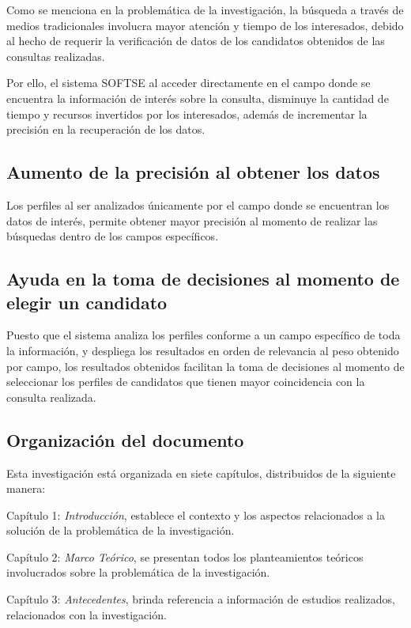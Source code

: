 Como se menciona en la problemática de la investigación, la búsqueda a través de medios tradicionales involucra mayor atención y tiempo de los interesados, debido al hecho de requerir la verificación de datos de los candidatos obtenidos de las consultas realizadas.

Por ello, el sistema SOFTSE al acceder directamente en el campo donde se encuentra la información de interés sobre la consulta, disminuye la cantidad de tiempo y recursos invertidos por los interesados, además de incrementar la precisión en la recuperación de los datos.

\subsection{Aumento de la precisión al obtener los datos}
\label{subsec:subsec05}

Los perfiles al ser analizados únicamente por el campo donde se encuentran los datos de interés, permite obtener mayor precisión al momento de realizar las búsquedas dentro de los campos específicos.

\subsection{Ayuda en la toma de decisiones al momento de elegir un candidato}
\label{subsec:subsec05}

Puesto que el sistema analiza los perfiles conforme a un campo específico de toda la información, y despliega los resultados en orden de relevancia al peso obtenido por campo, los resultados obtenidos facilitan la toma de decisiones al momento de seleccionar los perfiles de candidatos que tienen mayor coincidencia con la consulta realizada.

\subsection{Organización del documento}
\label{subsec:subsec06}
Esta investigaci\'on está organizada en siete cap\'itulos, distribuidos de la siguiente manera:

Cap\'itulo 1:  \textit{Introducci\'on}, establece el contexto y los aspectos relacionados a la soluci\'on de la problem\'atica de la investigaci\'on.

Cap\'itulo 2: \textit{Marco Te\'orico}, se presentan todos los planteamientos te\'oricos involucrados sobre la problem\'atica de la investigaci\'on.

Cap\'itulo 3: \textit{Antecedentes}, brinda referencia a informaci\'on de estudios realizados, relacionados con la investigaci\'on.


